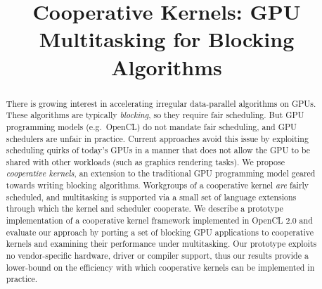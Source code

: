 \documentclass[parskip=half,sigconf,review, anonymous=true, acmcopyrightmode=none]{acmart}
\makeatletter
\renewcommand\paragraph{\@startsection{paragraph}{4}{\z@}%
  {-.5\baselineskip \@plus -2\p@ \@minus -.2\p@}%
  {-3.5\p@}%
  {\bfseries\@parfont}}
\makeatother
\begin{document}
\title{Cooperative Kernels: GPU Multitasking for Blocking Algorithms}

\begin{abstract}
There is growing interest in accelerating irregular data-parallel
algorithms on GPUs.  These algorithms are typically \emph{blocking},
so they require fair scheduling.  But GPU programming models
(e.g.\ OpenCL) do not mandate fair scheduling, and GPU schedulers are
unfair in practice.  Current approaches avoid this issue by exploiting
scheduling quirks of today's GPUs in a manner that does not allow the
GPU to be shared with other workloads (such as graphics rendering
tasks).  We propose \emph{cooperative kernels}, an extension to the
traditional GPU programming model geared towards writing blocking
algorithms.  Workgroups of a cooperative kernel \emph{are} fairly
scheduled, and multitasking is supported via a small set of language
extensions through which the kernel and scheduler cooperate.  We
describe a prototype implementation of a cooperative kernel framework
implemented in OpenCL 2.0 and evaluate our approach by porting a set
of blocking GPU applications to cooperative kernels and examining
their performance under multitasking.  Our prototype exploits no
vendor-specific hardware, driver or compiler support, thus our results
provide a lower-bound on the efficiency with which cooperative kernels
can be implemented in practice.

\end{abstract}


%
%





\maketitle

\newcommand{\myparagraph}[1]{\paragraph{#1.}}
\end{document}
